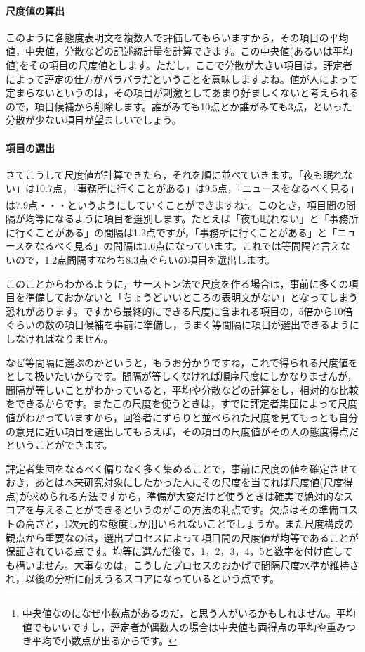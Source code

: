 \documentclass{ltjsbook}
\begin{document}
\paragraph{尺度値の算出}このように各態度表明文を複数人で評価してもらいますから，その項目の平均値，中央値，分散などの記述統計量を計算できます。この中央値(あるいは平均値)をその項目の尺度値とします。ただし，ここで分散が大きい項目は，評定者によって評定の仕方がバラバラだということを意味しますよね。値が人によって定まらないというのは，その項目が刺激としてあまり好ましくないと考えられるので，項目候補から削除します。誰がみても10点とか誰がみても3点，といった分散が少ない項目が望ましいでしょう。

\paragraph{項目の選出}さてこうして尺度値が計算できたら，それを順に並べていきます。「夜も眠れない」は10.7点，「事務所に行くことがある」は9.5点，「ニュースをなるべく見る」は7.9点・・・というようにしていくことができますね\footnote{中央値なのになぜ小数点があるのだ，と思う人がいるかもしれません。平均値でもいいですし，評定者が偶数人の場合は中央値も両得点の平均や重みつき平均で小数点が出るからです。}。このとき，項目間の間隔が均等になるように項目を選別します。たとえば「夜も眠れない」と「事務所に行くことがある」の間隔は1.2点ですが，「事務所に行くことがある」と「ニュースをなるべく見る」の間隔は1.6点になっています。これでは等間隔と言えないので，1.2点間隔すなわち8.3点ぐらいの項目を選出します。

このことからわかるように，サーストン法で尺度を作る場合は，事前に多くの項目を準備しておかないと「ちょうどいいところの表明文がない」となってしまう恐れがあります。ですから最終的にできる尺度に含まれる項目の，5倍から10倍ぐらいの数の項目候補を事前に準備し，うまく等間隔に項目が選出できるようにしなければなりません。

なぜ等間隔に選ぶのかというと，もうお分かりですね，これで得られる尺度値をとして扱いたいからです。間隔が等しくなければ順序尺度にしかなりませんが，間隔が等しいことがわかっていると，平均や分散などの計算をし，相対的な比較をできるからです。またこの尺度を使うときは，すでに評定者集団によって尺度値がわかっていますから，回答者にずらりと並べられた尺度を見てもっとも自分の意見に近い項目を選出してもらえば，その項目の尺度値がその人の態度得点だということができます。

評定者集団をなるべく偏りなく多く集めることで，事前に尺度の値を確定させておき，あとは本来研究対象にしたかった人にその尺度を当てれば尺度値(尺度得点)が求められる方法ですから，準備が大変だけど使うときは確実で絶対的なスコアを与えることができるというのがこの方法の利点です。欠点はその準備コストの高さと，1次元的な態度しか用いられないことでしょうか。また尺度構成の観点から重要なのは，選出プロセスによって項目間の尺度値が均等であることが保証されている点です。均等に選んだ後で，1，2，3，4，5と数字を付け直しても構いません。大事なのは，こうしたプロセスのおかげで間隔尺度水準が維持され，以後の分析に耐えうるスコアになっているという点です。
\end{document}
